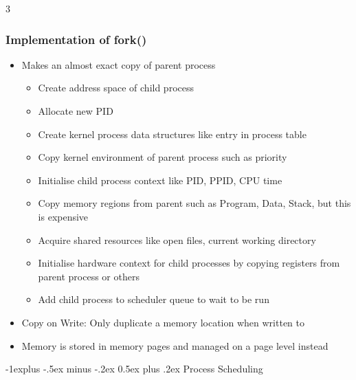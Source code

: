 \documentclass[10pt, landscape]{article}
\makeatletter
\renewcommand{\section}{\@startsection{section}{1}{0mm}%
                                {-1ex plus -.5ex minus -.2ex}%
                                {0.5ex plus .2ex}%
                                {\normalfont\large\bfseries}}
\renewcommand{\section}{\@startsection{section}{2}{0mm}%
                                {-1explus -.5ex minus -.2ex}%
                                {0.5ex plus .2ex}%
                                {\normalfont\normalsize\bfseries}}
\makeatother
\begin{document}
\begin{multicols*}{3}
\subsubsection{Implementation of fork()}
\begin{itemize}
    \item Makes an almost exact copy of parent process
    \begin{itemize}
        \item Create address space of child process
        \item Allocate new PID
        \item Create kernel process data structures like entry in process table
        \item Copy kernel environment of parent process such as priority
        \item Initialise child process context like PID, PPID, CPU time
        \item Copy memory regions from parent such as Program, Data, Stack, but this is expensive
        \item Acquire shared resources like open files, current working directory
        \item Initialise hardware context for child processes by copying registers from parent process or others
        \item Add child process to scheduler queue to wait to be run
    \end{itemize}
    \item Copy on Write: Only duplicate a memory location when written to
    \item Memory is stored in memory pages and managed on a page level instead
\end{itemize}

\section{Process Scheduling}


\end{multicols*}
\end{document}
